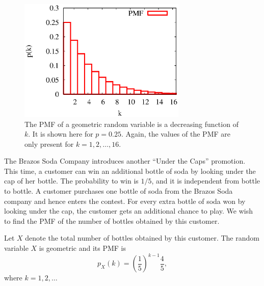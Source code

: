 \begin{figure}[ht]
\begin{center}
\includegraphics[width=8cm]{Figures/5chapter/geometric}
\end{center}
\caption{The PMF of a geometric random variable is a decreasing function of $k$.
It is shown here for $p = 0.25$.
Again, the values of the PMF are only present for $k = 1, 2, \ldots, 16$.}
\end{figure}

\begin{example}
The Brazos Soda Company introduces another ``Under the Caps'' promotion.
This time, a customer can win an additional bottle of soda by looking under the cap of her bottle.
The probability to win is $1/5$, and it is independent from bottle to bottle.
A customer purchases one bottle of soda from the Brazos Soda company and hence enters the contest.
For every extra bottle of soda won by looking under the cap, the customer gets an additional chance to play.
We wish to find the PMF of the number of bottles obtained by this customer.

Let $X$ denote the total number of bottles obtained by this customer.
The random variable $X$ is geometric and its PMF is
\begin{equation*}
p_X (k) = \left( \frac{1}{5} \right)^{k-1} \frac{4}{5},
\end{equation*}
where $k = 1, 2, \ldots$
\end{example}

